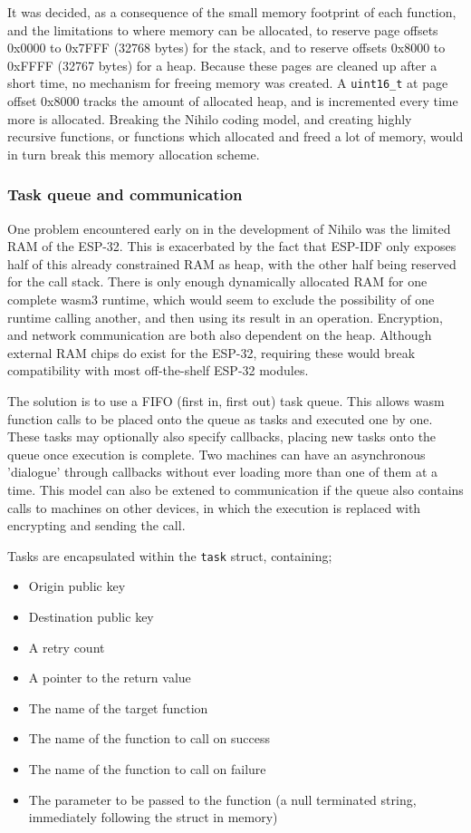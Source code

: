 \documentclass{article}
\begin{document}
It was decided, as a consequence of the small memory footprint of each function, and the limitations to where memory can be allocated, to reserve page offsets 0x0000 to 0x7FFF (32768 bytes) for the stack, and to reserve offsets 0x8000 to 0xFFFF (32767 bytes) for a heap. Because these pages are cleaned up after a short time, no mechanism for freeing memory was created. A \texttt{uint16\_t} at page offset 0x8000 tracks the amount of allocated heap, and is incremented every time more is allocated. Breaking the Nihilo coding model, and creating highly recursive functions, or functions which allocated and freed a lot of memory, would in turn break this memory allocation scheme.


\subsubsection{Task queue and communication}

One problem encountered early on in the development of Nihilo was the limited RAM of the ESP-32. This is exacerbated by the fact that ESP-IDF only exposes half of this already constrained RAM as heap, with the other half being reserved for the call stack. There is only enough dynamically allocated RAM for one complete wasm3 runtime, which would seem to exclude the possibility of one runtime calling another, and then using its result in an operation. Encryption, and network communication are both also dependent on the heap. Although external RAM chips do exist for the ESP-32, requiring these would break compatibility with most off-the-shelf ESP-32 modules.

The solution is to use a FIFO (first in, first out) task queue. This allows wasm function calls to be placed onto the queue as tasks and executed one by one. These tasks may optionally also specify callbacks, placing new tasks onto the queue once execution is complete. Two machines can have an asynchronous 'dialogue' through callbacks without ever loading more than one of them at a time. This model can also be extened to communication if the queue also contains calls to machines on other devices, in which the execution is replaced with encrypting and sending the call.

Tasks are encapsulated within the \texttt{task} struct, containing;
\begin{itemize}
\item Origin public key
\item Destination public key
\item A retry count
\item A pointer to the return value
\item The name of the target function
\item The name of the function to call on success
\item The name of the function to call on failure
\item The parameter to be passed to the function (a null terminated string, immediately following the struct in memory)
\end{itemize}
\end{document}

